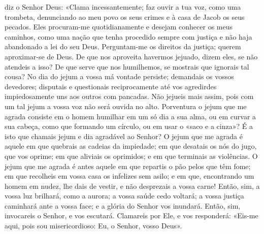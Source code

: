 \begin{paracol}{2}
{ diz o Senhor Deus: «Clama incessantemente; faz ouvir a tua voz, como uma trombeta, denunciando ao meu povo os seus crimes e à casa de Jacob os seus pecados. Eles procuram-me quotidianamente e desejam conhecer os meus caminhos, como uma nação que tenha procedido sempre com justiça e não haja abandonado a lei do seu Deus. Perguntam-me os direitos da justiça; querem aproximar-se de Deus. De que nos aproveita havermos jejuado, dizem eles, se não atendeis a isso? De que serve que nos humilhemos, se mostrais que ignorais tal cousa? No dia do jejum a vossa má vontade persiste; demandais os vossos devedores; disputais e questionais reciprocamente até vos agredirdes impiedosamente uns aos outros com pancadas. Não jejueis mais assim, pois com um tal jejum a vossa voz não será ouvida no alto. Porventura o jejum que me agrada consiste em o homem humilhar em um só dia a sua alma, ou em curvar a sua cabeça, como que formando um círculo, ou em usar o «saco e a cinza»? É a isto que chamais jejum e dia agradável ao Senhor? O jejum que me agrada é aquele em que quebrais as cadeias da impiedade; em que desatais os nós do jugo, que vos oprime; em que aliviais os oprimidos; e em que terminais as violências. O jejum que me agrada é antes aquele em que repartis o pão pelos que têm fome; em que recolheis em vossa casa os infelizes sem asilo; e em que, encontrando um homem em nudez, lhe dais de vestir, e não desprezais a vossa carne! Então, sim, a vossa luz brilhará, como a aurora; a vossa saúde cedo voltará; a vossa justiça caminhará ante a vossa face; e a glória do Senhor vos inundará. Então, sim, invocareis o Senhor, e vos escutará. Clamareis por Ele, e vos responderá: «Eis-me aqui, pois sou misericordioso: Eu, o Senhor, vosso Deus».
}\end{paracol}

\begin{paracol}{2}\switchcolumn{}\end{paracol}


